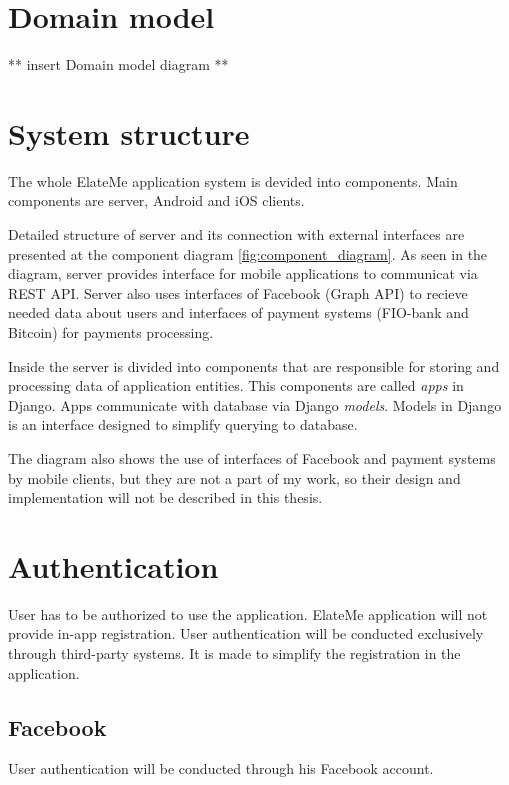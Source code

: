 \section{Domain model}
** insert Domain model diagram **



\section{System structure}
The whole ElateMe application system is devided into components. Main components are server, Android and iOS clients.

Detailed structure of server and its connection with external interfaces are presented at the component diagram
\ref{fig:component_diagram}. As seen in the diagram, server provides interface for mobile applications to communicat via
REST API. Server also uses interfaces of Facebook (Graph API) to recieve needed data about users and interfaces of
payment systems (FIO-bank and Bitcoin) for payments processing.

Inside the server is divided into components that are responsible for storing and processing data of application
entities. This components are called \textit{apps} in Django. Apps communicate with database via Django \textit{models}.
Models in Django is an interface designed to simplify querying to database.


The diagram also shows the use of interfaces of Facebook and payment systems by mobile clients, but they are not a part
of my work, so their design and implementation will not be described in this thesis.



\section{Authentication}
User has to be authorized to use the application. ElateMe application will not provide in-app registration. User
authentication will be conducted exclusively through third-party systems. It is made to simplify the
registration in the application.


\subsection{Facebook}
User authentication will be conducted through his Facebook account.

